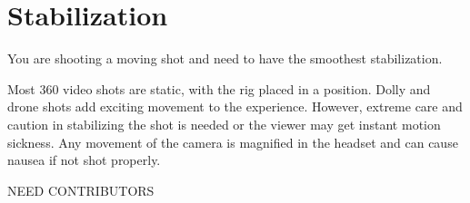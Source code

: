 \chapter{Stabilization}
\pagecolor{white}
\label{chap:24}
\begin{fullwidth}


\problem

{\large You are shooting a moving shot and need to have the smoothest stabilization. \par}

Most 360 video shots are static, with the rig placed in a position. Dolly and drone shots add exciting movement to the experience. However, extreme care and caution in stabilizing the shot is needed or the viewer may get instant motion sickness. Any movement of the camera is magnified in the headset and can cause nausea if not shot properly.


\solution

{\large NEED CONTRIBUTORS  
 \par}




\clearpage
\end{fullwidth}
